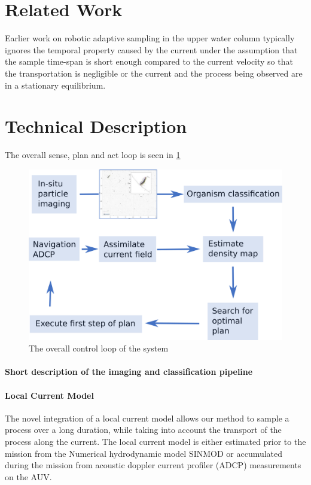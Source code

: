 \documentclass[conference]{IEEEtran}
\begin{document}
\section{Related Work}
Earlier work on robotic adaptive sampling in the upper water column typically ignores the temporal property caused by the current under the assumption that the sample time-span is short enough compared to the current velocity so that the transportation is negligible or the current and the process being observed are in a stationary equilibrium.

\section{Technical Description}
The overall sense, plan and act loop is seen in \cref{fig:sensePlanActLoop}

\begin{figure}[tbp]
\centerline{\includegraphics[width=\linewidth]{figures/workflow-simplified.png}}
\caption{The overall control loop of the system}
\label{fig:sensePlanActLoop}
\end{figure}

\paragraph{Short description of the imaging and classification pipeline}

\paragraph{Local Current Model}
The novel integration of a local current model allows our method to sample a process over a long duration, while taking into account the transport of the process along the current.
The local current model is either estimated prior to the mission from the Numerical hydrodynamic model SINMOD or accumulated during the mission from acoustic doppler current profiler (ADCP) measurements on the AUV.
\end{document}
